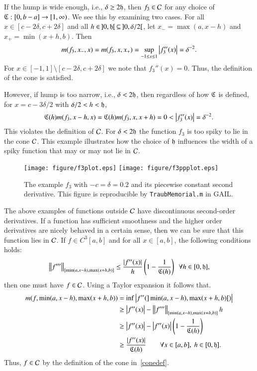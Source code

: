 \documentclass[review]{elsarticle}
\theoremstyle{definition}
\begin{document}
If the hump is wide enough, i.e., $\delta \ge 2 \fh$, then $f_3 \in \cc$ for
any choice of $\fC : [0,b-a] \to [1,\infty)$.  We see this by examining two cases.  For all $x \in [c - 2 \delta, c + 2 \delta]$ and all $h \in \, ]0,\fh[ \, \subseteq \, ]0,\delta/2[$, let $x_- = \max(a, x -h)$ and $x_+ = \min(x +h,b)$.  Then
\[
m(f_3,x_-,x) = m(f_3,x,x_+) = \sup_{-1 \le x \le 1} \abs{f_3''(x)}  = \delta^{-2}.
\]
For $x \in [-1,1] \setminus [c - 2 \delta , c + 2 \delta]$ we note that $f_3''(x) = 0$. Thus, the definition of the cone is satisfied.

However, if hump is too narrow, i.e.,  $\delta < 2 \fh$, then regardless of how $\fC$ is defined, for $x = c-3\delta/2$ with $\delta/2 < h < \fh$, 
\[
\fC(h)m(f_3,x - h,x)=\fC(h)m(f_3,x,x+h)=0 < \abs{f''_3(x)} = \delta^{-2}.
\]
This violates the definition of $\cc$.  For $\delta < 2 \fh$ the function $f_3$ is too spiky to lie in the cone $\cc$.   This example illustrates how the choice of $\fh$ influences the width of
a spiky function that may or may not lie in $\cc$.

\begin{figure}[t]
\centering
\texttt{[image: figure/f3plot.eps]} \quad
\texttt{[image: figure/f3ppplot.eps]}
\caption{The example $f_3$ with $-c=\delta = 0.2$ and its piecewise constant
second derivative. This figure is reproducible by {\tt TraubMemorial.m} in
GAIL.}
\label{f3fig}
\end{figure}

The above examples of functions outside $\cc$ have  discontinuous second-order
derivatives. If a function has sufficient smoothness and the higher order derivatives are nicely behaved in a certain sense, then we can be sure that this function lies in $\cc$.   If  $f \in C^3[a,b]$ and for all $x \in [a,b]$, the following conditions holds:
\begin{equation} \label{conesuffconda}
\norm[{[\min(a,x-h),\max(x+h,b)]}]{f'''} \le \frac{\abs{f''(x)}}{h} \left( 1 - \frac{1}{\fC(h)} \right) \ \ \forall h \in [0,\fh],
\end{equation}
then one must have $f \in \cc$.  Using a Taylor expansion it follows that.
\begin{align*}
m(f,\min(a,x-h),\max(x+h,b)) & = \inf \abs{f''(]\min(a,x-h),\max(x+h,b)[)} \\
& \ge \abs{f''(x)}  - \norm[{[\min(a,x-h),\max(x+h,b)]}]{f'''}h \\
& \ge \abs{f''(x)}  - \abs{f''(x)}\left( 1 - \frac{1}{\fC(h)} \right) \\
& \ge \frac{\abs{f''(x)}}{\fC(h)} \qquad \forall x \in [a,b],\ h \in [0,\fh].
\end{align*}
Thus, $f \in \cc$ by the definition of the cone in~\eqref{conedef}.
\end{document}
